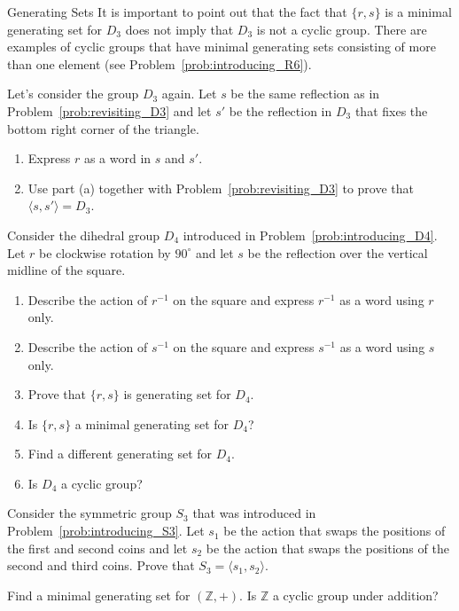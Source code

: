 \begin{section}{Generating Sets}
It is important to point out that the fact that $\{r,s\}$ is a minimal generating set for $D_3$ does not imply that $D_3$ is not a cyclic group. There are examples of cyclic groups that have minimal generating sets consisting of more than one element (see Problem~\ref{prob:introducing_R6}).

\begin{problem}\label{prob:alternate_D3}
Let's consider the group $D_3$ again. Let $s$ be the same reflection as in Problem~\ref{prob:revisiting_D3} and let $s'$ be the reflection in $D_3$ that fixes the bottom right corner of the triangle.
\begin{enumerate}[label=\rm{(\alph*)}]
\item Express $r$ as a word in $s$ and $s'$.
\item Use part (a) together with Problem~\ref{prob:revisiting_D3} to prove that $\langle s,s'\rangle=D_3$.
\end{enumerate}
\end{problem}

\begin{problem}\label{prob:revisiting_D4}
Consider the dihedral group $D_4$ introduced in Problem~\ref{prob:introducing_D4}. Let $r$ be clockwise rotation by $90^\circ$ and let $s$ be the reflection over the vertical midline of the square.
\begin{enumerate}[label=\rm{(\alph*)}]
\item Describe the action of $r^{-1}$ on the square and express $r^{-1}$ as a word using $r$ only.
\item Describe the action of $s^{-1}$ on the square and express $s^{-1}$ as a word using $s$ only.
\item Prove that $\{r,s\}$ is generating set for $D_4$.
\item Is $\{r,s\}$ a minimal generating set for $D_4$?
\item Find a different generating set for $D_4$.
\item Is $D_4$ a cyclic group?
\end{enumerate} 
\end{problem}

\begin{problem}\label{prob:revisiting_S3}
Consider the symmetric group $S_3$ that was introduced in Problem~\ref{prob:introducing_S3}. Let $s_1$ be the action that swaps the positions of the first and second coins and let $s_2$ be the action that swaps the positions of the second and third coins. Prove that $S_3=\langle s_1, s_2\rangle$.
\end{problem}

\begin{problem}
Find a minimal generating set for $(\mathbb{Z},+)$.  Is $\mathbb{Z}$ a cyclic group under addition?
\end{problem}

\end{section}

